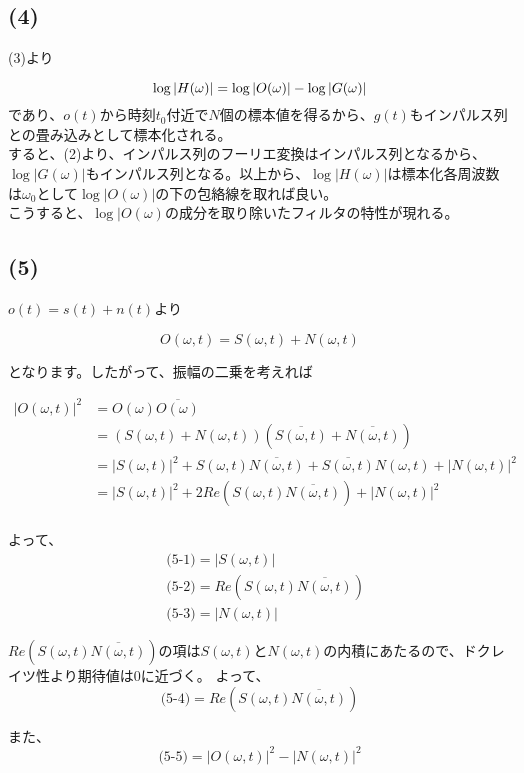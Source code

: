 \documentclass[a4paper,12pt,xelatex,ja=standard]{bxjsarticle}
\begin{document}
\subsection*{(4)}
(3)より

\[
  \log |H(\omega)| = \log |O(\omega)| - \log |G(\omega)| \\
\]
であり、$o(t)$から時刻$t_0$付近で$N$個の標本値を得るから、$g(t)$もインパルス列との畳み込みとして標本化される。\\
すると、(2)より、インパルス列のフーリエ変換はインパルス列となるから、$\log | G(\omega) |$もインパルス列となる。以上から、$\log | H(\omega) |$は標本化各周波数は$\omega_0$として$\log |O(\omega)|$の下の包絡線を取れば良い。\\
こうすると、$\log | O(\omega)$の成分を取り除いたフィルタの特性が現れる。

\subsection*{(5)}
$o(t) = s(t) + n(t)$より

\[
  O(\omega, t) = S(\omega, t) + N(\omega, t)
\]

となります。したがって、振幅の二乗を考えれば

\begin{equation*}
  \begin{split}
    | O(\omega, t) |^2
      &= O(\omega) \overline{O(\omega)} \\
      &= (S(\omega, t) + N(\omega, t))\left(\overline{S(\omega, t)} + \overline{N(\omega, t)}\right) \\
      &= |S(\omega, t)|^2 + S(\omega, t) \overline{N(\omega, t)} + \overline{S(\omega, t)}N(\omega, t) + |N(\omega, t)|^2 \\
      &= |S(\omega, t)|^2 + 2Re(S(\omega, t) \overline{N(\omega, t)}) + |N(\omega, t)|^2 \\
  \end{split}
\end{equation*}

よって、
\begin{equation*}
  \begin{split}
    &\text{(5-1)} = |S(\omega, t)| \\
    &\text{(5-2)} = Re(S(\omega, t) \overline{N(\omega, t)})\\
    &\text{(5-3)} = |N(\omega, t)|
  \end{split}
\end{equation*}

$Re(S(\omega, t) \overline{N(\omega, t)})$の項は$S(\omega, t)$と$N(\omega, t)$の内積にあたるので、ドクレイツ性より期待値は0に近づく。
よって、
\[
  \text{(5-4)} = Re(S(\omega, t) \overline{N(\omega, t)})
\]

また、
\[
  \text{(5-5)} = |O(\omega, t)|^2 - |N(\omega, t)|^2
\]
\end{document}
